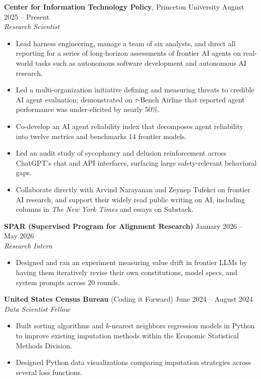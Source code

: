 \documentclass[11pt]{article}
\begin{document}
\textbf{Center for Information Technology Policy}, Princeton University \hfill August 2025 -- Present\\
\textit{Research Scientist}
\begin{itemize}[leftmargin=0.25in,noitemsep,topsep=2pt]
    \item Lead harness engineering, manage a team of six analysts, and direct all reporting for a series of long-horizon assessments of frontier AI agents on real-world tasks such as autonomous software development and autonomous AI research.
    \item Led a multi-organization initiative defining and measuring threats to credible AI agent evaluation; demonstrated on $\tau$-Bench Airline that reported agent performance was under-elicited by nearly 50\%.
    \item Co-develop an AI agent reliability index that decomposes agent reliability into twelve metrics and benchmarks 14 frontier models.
    \item Led an audit study of sycophancy and delusion reinforcement across ChatGPT's chat and API interfaces, surfacing large safety-relevant behavioral gaps.
    \item Collaborate directly with Arvind Narayanan and Zeynep Tufekci on frontier AI research, and support their widely read public writing on AI, including columns in \textit{The New York Times} and essays on Substack.
\end{itemize}

\vspace{0.6em}
\textbf{SPAR (Supervised Program for Alignment Research)} \hfill January 2026 -- May 2026\\
\textit{Research Intern}
\begin{itemize}[leftmargin=0.25in,noitemsep,topsep=2pt]
    \item Designed and ran an experiment measuring value drift in frontier LLMs by having them iteratively revise their own constitutions, model specs, and system prompts across 20 rounds.
\end{itemize}

\vspace{0.6em}
\textbf{United States Census Bureau} (Coding it Forward) \hfill June 2024 -- August 2024\\
\textit{Data Scientist Fellow}
\begin{itemize}[leftmargin=0.25in,noitemsep,topsep=2pt]
    \item Built sorting algorithms and $k$-nearest neighbors regression models in Python to improve existing imputation methods within the Economic Statistical Methods Division.
    \item Designed Python data visualizations comparing imputation strategies across several loss functions.
\end{itemize}
\end{document}
